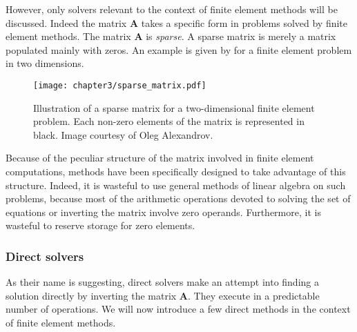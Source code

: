 However, only solvers relevant to the context of finite element methods will be discussed. Indeed the matrix $ \mathbf{A} $ takes a specific form in problems solved by finite element methods. The matrix $ \mathbf{A} $ is \emph{sparse}. A sparse matrix is merely a matrix populated mainly with zeros. An example is given by  for a finite element problem in two dimensions.
\begin{figure}
\begin{center}
\texttt{[image: chapter3/sparse\_matrix.pdf]}
\end{center}
\caption[Illustration of a sparse matrix for a 2D finite element problem]{Illustration of a sparse matrix for a two-dimensional finite element problem. Each non-zero elements of the matrix is represented in black. Image courtesy of Oleg Alexandrov.}
\label{chap3:fig-sparse}
\end{figure}
Because of the peculiar structure of the matrix involved in finite element computations, methods have been specifically designed to take advantage of this structure. Indeed, it is wasteful to use general methods of linear algebra on such problems, because most of the arithmetic operations devoted to solving the set of equations or inverting the matrix involve zero operands. Furthermore, it is wasteful to reserve storage for zero elements. 

	
		\subsubsection*{Direct solvers}
As their name is suggesting, direct solvers make an attempt into finding a solution directly by inverting the matrix $ \mathbf{A} $. They execute in a predictable number of operations. We will now introduce a few direct methods in the context of finite element methods. 


